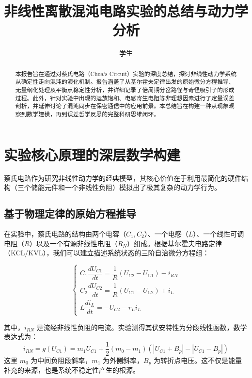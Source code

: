 \documentclass[12pt,a4paper]{article}
\begin{document}
%

\title{非线性离散混沌电路实验的总结与动力学分析}
\author{学生\\[学号已脱敏]}

\maketitle
\begin{abstract}
    本报告旨在通过对蔡氏电路（Chua's Circuit）实验的深度总结，探讨非线性动力学系统从确定性走向混沌的演化机制。报告涵盖了从基尔霍夫定律出发的原始微分方程推导、无量纲化处理及平衡点稳定性分析，并详细记录了倍周期分岔路径与奇怪吸引子的形成过程。此外，针对实验中出现的运放饱和、电感寄生电阻等非理想因素进行了定量误差剖析，并延伸讨论了混沌同步在保密通信中的应用前景。本总结旨在构建一种从现象观察到数学建模，再到误差哲学反思的完整科研思维闭环。
\end{abstract}

\vspace{1em}

\section{实验核心原理的深层数学构建}

蔡氏电路作为研究非线性动力学的经典模型，其核心价值在于利用最简化的硬件结构（三个储能元件和一个非线性负阻）模拟出了极其复杂的动力学行为。

\subsection{基于物理定律的原始方程推导}
在实验中，蔡氏电路的结构由两个电容（$C_1, C_2$）、一个电感（$L$）、一个线性可调电阻（$R$）以及一个有源非线性电阻（$R_N$）组成。根据基尔霍夫电路定律（KCL/KVL），我们可以建立描述系统状态的三阶自治微分方程组：



\begin{equation}
\begin{cases}
C_1 \dfrac{d U_{C1}}{dt} = \dfrac{1}{R}(U_{C2} - U_{C1}) - i_{RN} \\[3mm]
C_2 \dfrac{d U_{C2}}{dt} = \dfrac{1}{R}(U_{C1} - U_{C2}) + i_L \\[3mm]
L \dfrac{d i_L}{dt} = -U_{C2} - r_L i_L
\end{cases}
\end{equation}

其中，$i_{RN}$ 是流经非线性负阻的电流。实验测得其伏安特性为分段线性函数，数学表达式为：
\begin{equation}
i_{RN} = g(U_{C1}) = m_1 U_{C1} + \frac{1}{2}(m_0 - m_1)(|U_{C1} + B_p| - |U_{C1} - B_p|)
\end{equation}
这里 $m_0$ 为中间负阻段斜率，$m_1$ 为外侧斜率，$B_p$ 为转折点电压。这不仅是能量补充的来源，也是系统不稳定性产生的根源。
\end{document}
